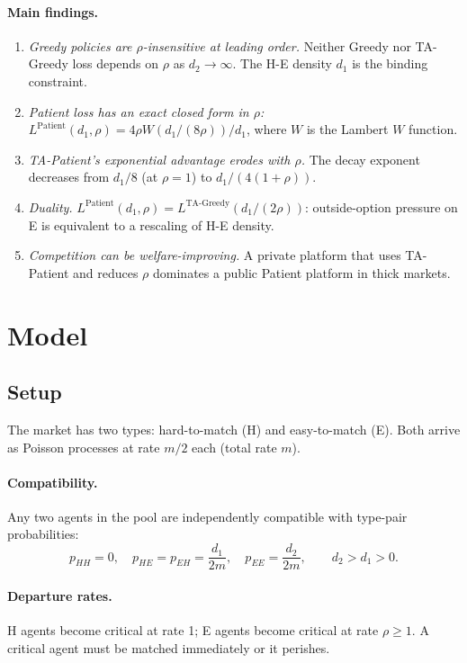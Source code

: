 \documentclass{article}
\theoremstyle{plain}
\theoremstyle{definition}
\begin{document}
\paragraph{Main findings.}
\begin{enumerate}
\item \emph{Greedy policies are $\rho$-insensitive at leading order.}
  Neither Greedy nor TA-Greedy loss depends on $\rho$ as $d_2\to\infty$.
  The H-E density $d_1$ is the binding constraint.
\item \emph{Patient loss has an exact closed form in $\rho$:}
  $L^{\text{Patient}}(d_1,\rho)=4\rho W(d_1/(8\rho))/d_1$, where $W$ is
  the Lambert $W$ function.
\item \emph{TA-Patient's exponential advantage erodes with $\rho$.}
  The decay exponent decreases from $d_1/8$ (at $\rho=1$) to $d_1/(4(1+\rho))$.
\item \emph{Duality.}
  $L^{\text{Patient}}(d_1,\rho)=L^{\text{TA-Greedy}}(d_1/(2\rho))$:
  outside-option pressure on E is equivalent to a rescaling of H-E density.
\item \emph{Competition can be welfare-improving.}
  A private platform that uses TA-Patient and reduces $\rho$ dominates a
  public Patient platform in thick markets.
\end{enumerate}

\section{Model}
\label{sec:model}

\subsection{Setup}

The market has two types: hard-to-match (H) and easy-to-match (E).  Both
arrive as Poisson processes at rate $m/2$ each (total rate $m$).

\paragraph{Compatibility.}
Any two agents in the pool are independently compatible with type-pair
probabilities:
\[
  p_{HH}=0,\quad
  p_{HE}=p_{EH}=\frac{d_1}{2m},\quad
  p_{EE}=\frac{d_2}{2m},\qquad d_2>d_1>0.
\]

\paragraph{Departure rates.}
H agents become critical at rate 1; E agents become critical at rate
$\rho\ge 1$.  A critical agent must be matched immediately or it perishes.
\end{document}
